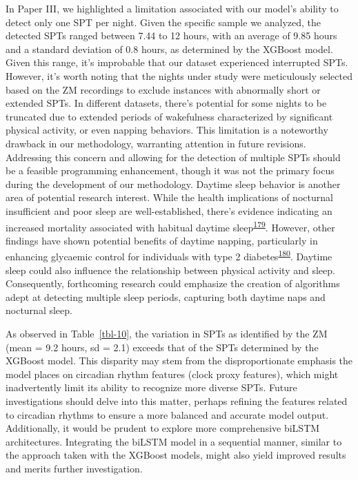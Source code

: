 \documentclass[
  10pt,
]{scrbook}
\begin{document}
In Paper III, we highlighted a limitation associated with our model's
ability to detect only one SPT per night. Given the specific sample we
analyzed, the detected SPTs ranged between 7.44 to 12 hours, with an
average of 9.85 hours and a standard deviation of 0.8 hours, as
determined by the XGBoost model. Given this range, it's improbable that
our dataset experienced interrupted SPTs. However, it's worth noting
that the nights under study were meticulously selected based on the ZM
recordings to exclude instances with abnormally short or extended SPTs.
In different datasets, there's potential for some nights to be truncated
due to extended periods of wakefulness characterized by significant
physical activity, or even napping behaviors. This limitation is a
noteworthy drawback in our methodology, warranting attention in future
revisions. Addressing this concern and allowing for the detection of
multiple SPTs should be a feasible programming enhancement, though it
was not the primary focus during the development of our methodology.
Daytime sleep behavior is another area of potential research interest.
While the health implications of nocturnal insufficient and poor sleep
are well-established, there's evidence indicating an increased mortality
associated with habitual daytime
sleep\textsuperscript{\protect\hyperlink{ref-burazeri_2003}{179}}.
However, other findings have shown potential benefits of daytime
napping, particularly in enhancing glycaemic control for individuals
with type 2
diabetes\textsuperscript{\protect\hyperlink{ref-makino_2018}{180}}.
Daytime sleep could also influence the relationship between physical
activity and sleep. Consequently, forthcoming research could emphasize
the creation of algorithms adept at detecting multiple sleep periods,
capturing both daytime naps and nocturnal sleep.

As observed in Table~\ref{tbl-10}, the variation in SPTs as identified
by the ZM (mean = 9.2 hours, sd = 2.1) exceeds that of the SPTs
determined by the XGBoost model. This disparity may stem from the
disproportionate emphasis the model places on circadian rhythm features
(clock proxy features), which might inadvertently limit its ability to
recognize more diverse SPTs. Future investigations should delve into
this matter, perhaps refining the features related to circadian rhythms
to ensure a more balanced and accurate model output. Additionally, it
would be prudent to explore more comprehensive biLSTM architectures.
Integrating the biLSTM model in a sequential manner, similar to the
approach taken with the XGBoost models, might also yield improved
results and merits further investigation.
\end{document}
